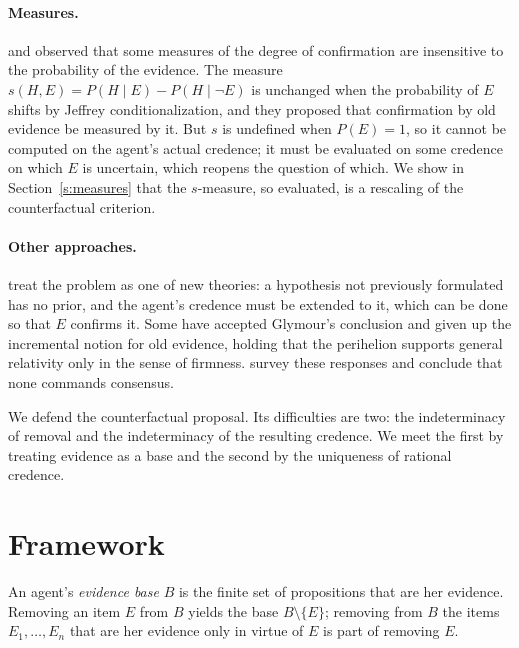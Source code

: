 \documentclass{situationist-preprint}
\begin{document}
\paragraph{Measures.} \citet{Christensen1999} and \citet{Joyce1999} observed that some measures of the degree of confirmation are insensitive to the probability of the evidence. The measure $s(H, E) = P(H \mid E) - P(H \mid \neg E)$ is unchanged when the probability of $E$ shifts by Jeffrey conditionalization, and they proposed that confirmation by old evidence be measured by it. But $s$ is undefined when $P(E) = 1$, so it cannot be computed on the agent's actual credence; it must be evaluated on some credence on which $E$ is uncertain, which reopens the question of which. We show in Section~\ref{s:measures} that the $s$-measure, so evaluated, is a rescaling of the counterfactual criterion.

\paragraph{Other approaches.} \citet{WenmackersRomeijn2016} treat the problem as one of new theories: a hypothesis not previously formulated has no prior, and the agent's credence must be extended to it, which can be done so that $E$ confirms it. Some have accepted Glymour's conclusion and given up the incremental notion for old evidence, holding that the perihelion supports general relativity only in the sense of firmness. \citet{SprengerHartmann2019} survey these responses and conclude that none commands consensus.

We defend the counterfactual proposal. Its difficulties are two: the indeterminacy of removal and the indeterminacy of the resulting credence. We meet the first by treating evidence as a base and the second by the uniqueness of rational credence.

\section{Framework}\label{s:framework}

\begin{definition}\label{d:base}
An agent's \emph{evidence base} $B$ is the finite set of propositions that are her evidence. Removing an item $E$ from $B$ yields the base $B \setminus \{E\}$; removing from $B$ the items $E_1, \dots, E_n$ that are her evidence only in virtue of $E$ is part of removing $E$.
\end{definition}
\end{document}
